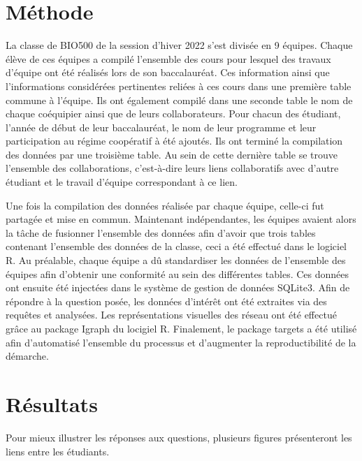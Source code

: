 \documentclass[9pt,twocolumn,twoside,]{pnas-new}
\begin{document}
\hypertarget{muxe9thode}{%
\section{Méthode}\label{muxe9thode}}

La classe de BIO500 de la session d'hiver 2022 s'est divisée en 9
équipes. Chaque élève de ces équipes a compilé l'ensemble des cours pour
lesquel des travaux d'équipe ont été réalisés lors de son baccalauréat.
Ces information ainsi que l'informations considérées pertinentes reliées
à ces cours dans une première table commune à l'équipe. Ils ont
également compilé dans une seconde table le nom de chaque coéquipier
ainsi que de leurs collaborateurs. Pour chacun des étudiant, l'année de
début de leur baccalauréat, le nom de leur programme et leur
participation au régime coopératif à été ajoutés. Ils ont terminé la
compilation des données par une troisième table. Au sein de cette
dernière table se trouve l'ensemble des collaborations, c'est-à-dire
leurs liens collaboratifs avec d'autre étudiant et le travail d'équipe
correspondant à ce lien.

Une fois la compilation des données réalisée par chaque équipe, celle-ci
fut partagée et mise en commun. Maintenant indépendantes, les équipes
avaient alors la tâche de fusionner l'ensemble des données afin d'avoir
que trois tables contenant l'ensemble des données de la classe, ceci a
été effectué dans le logiciel R. Au préalable, chaque équipe a dû
standardiser les données de l'ensemble des équipes afin d'obtenir une
conformité au sein des différentes tables. Ces données ont ensuite été
injectées dans le système de gestion de données SQLite3. Afin de
répondre à la question posée, les données d'intérêt ont été extraites
via des requêtes et analysées. Les représentations visuelles des réseau
ont été effectué grâce au package Igraph du locigiel R. Finalement, le
package targets a été utilisé afin d'automatisé l'ensemble du processus
et d'augmenter la reproductibilité de la démarche.

\hypertarget{ruxe9sultats}{%
\section{Résultats}\label{ruxe9sultats}}

Pour mieux illustrer les réponses aux questions, plusieurs figures
présenteront les liens entre les étudiants.
\end{document}

